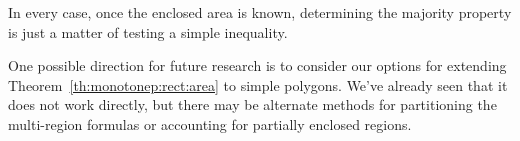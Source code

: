 In every case, once the enclosed area is known, determining the majority property is just a matter of testing a simple inequality.

One possible direction for future research is to consider our options for extending Theorem~\ref{th:monotonep:rect:area} to simple polygons. 
We've already seen that it does not work directly, but there may be alternate methods for partitioning the multi-region formulas or accounting for partially enclosed regions.

